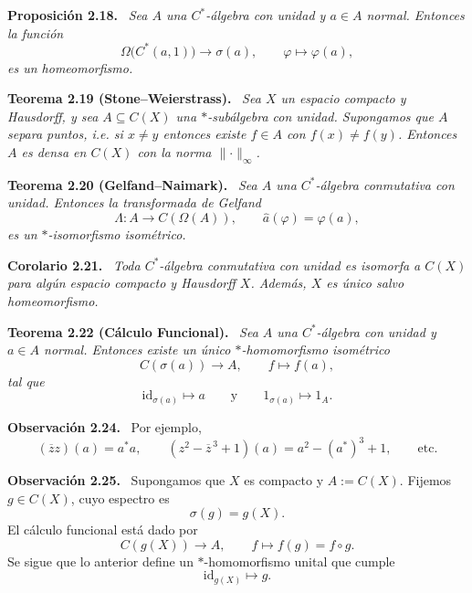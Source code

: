 \documentclass[11pt]{article}
\newcommand{\id}{\mathrm{id}}
\newenvironment{teorema}[1]
  {\par\medskip\noindent\textbf{Teorema #1.}\ \itshape}
  {\par\medskip}
\newenvironment{proposicion}[1]
  {\par\medskip\noindent\textbf{Proposición #1.}\ \itshape}
  {\par\medskip}
\newenvironment{corolario}[1]
  {\par\medskip\noindent\textbf{Corolario #1.}\ \itshape}
  {\par\medskip}
\newenvironment{observacion}[1]
  {\par\medskip\noindent\textbf{Observación #1.}\ }
  {\par\medskip}
\begin{document}
\begin{proposicion}{2.18}
Sea $A$ una $C^*$-álgebra con unidad y $a\in A$ normal. Entonces la función
\[
  \Omega\bigl(C^*(a,1)\bigr)\longrightarrow\sigma(a),
  \qquad
  \varphi\longmapsto\varphi(a),
\]
es un homeomorfismo.
\end{proposicion}

\begin{teorema}{2.19 (Stone--Weierstrass)}
Sea $X$ un espacio compacto y Hausdorff, y sea $A\subseteq C(X)$ una $*$-subálgebra con unidad. Supongamos que $A$ separa puntos, i.e. si $x\neq y$ entonces existe $f\in A$ con $f(x)\neq f(y)$. Entonces $A$ es densa en $C(X)$ con la norma $\lVert\cdot\rVert_\infty$.
\end{teorema}

\begin{teorema}{2.20 (Gelfand--Naimark)}
Sea $A$ una $C^*$-álgebra conmutativa con unidad. Entonces la transformada de Gelfand
\[
  \Lambda:A\longrightarrow C(\Omega(A)),
  \qquad
  \widehat a(\varphi)=\varphi(a),
\]
es un $*$-isomorfismo isométrico.
\end{teorema}

\begin{corolario}{2.21}
Toda $C^*$-álgebra conmutativa con unidad es isomorfa a $C(X)$ para algún espacio compacto y Hausdorff $X$. Además, $X$ es único salvo homeomorfismo.
\end{corolario}

\begin{teorema}{2.22 (Cálculo Funcional)}
Sea $A$ una $C^*$-álgebra con unidad y $a\in A$ normal. Entonces existe un único $*$-homomorfismo isométrico
\[
  C(\sigma(a))\longrightarrow A,
  \qquad
  f\longmapsto f(a),
\]
tal que
\[
  \id_{\sigma(a)}\longmapsto a
  \qquad\text{y}\qquad
  1_{\sigma(a)}\longmapsto 1_A.
\]
\end{teorema}

\begin{observacion}{2.24}
Por ejemplo,
\[
  (\overline z z)(a)=a^*a,
  \qquad
  (z^2-\overline z^{\,3}+1)(a)=a^2-(a^*)^3+1,
  \qquad\text{etc.}
\]
\end{observacion}

\begin{observacion}{2.25}
Supongamos que $X$ es compacto y $A:=C(X)$. Fijemos $g\in C(X)$, cuyo espectro es
\[
  \sigma(g)=g(X).
\]
El cálculo funcional está dado por
\[
  C(g(X))\longrightarrow A,
  \qquad
  f\longmapsto f(g)=f\circ g.
\]
Se sigue que lo anterior define un $*$-homomorfismo unital que cumple
\[
  \id_{g(X)}\longmapsto g.
\]
\end{observacion}
\end{document}
